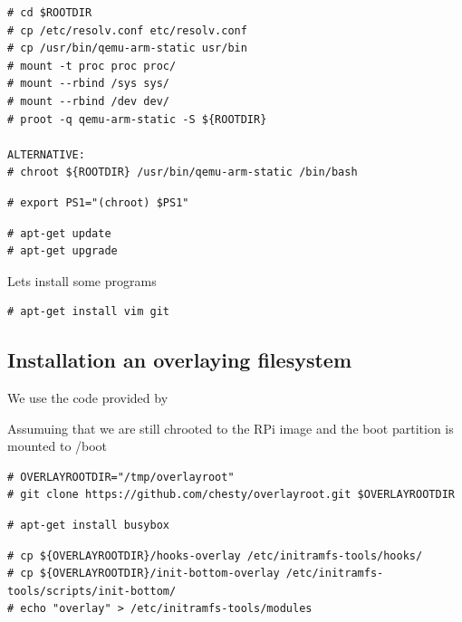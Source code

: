 \begin{lstlisting}[]
# cd $ROOTDIR
# cp /etc/resolv.conf etc/resolv.conf
# cp /usr/bin/qemu-arm-static usr/bin
# mount -t proc proc proc/
# mount --rbind /sys sys/
# mount --rbind /dev dev/
# proot -q qemu-arm-static -S ${ROOTDIR}

ALTERNATIVE:
# chroot ${ROOTDIR} /usr/bin/qemu-arm-static /bin/bash
\end{lstlisting}
\FloatBarrier


\begin{lstlisting}[]
# export PS1="(chroot) $PS1"
\end{lstlisting}
\FloatBarrier



\begin{lstlisting}[]
# apt-get update
# apt-get upgrade
\end{lstlisting}
\FloatBarrier

Lets install some programs
\begin{lstlisting}[]
# apt-get install vim git
\end{lstlisting}
\FloatBarrier



\subsection{Installation an overlaying filesystem}

We use the code provided by 

Assumuing that we are still chrooted to the RPi image and the boot partition is mounted to /boot

\begin{lstlisting}[]
# OVERLAYROOTDIR="/tmp/overlayroot"
# git clone https://github.com/chesty/overlayroot.git $OVERLAYROOTDIR
\end{lstlisting}
\FloatBarrier

\begin{lstlisting}[]
# apt-get install busybox
\end{lstlisting}
\FloatBarrier

\begin{lstlisting}[]
# cp ${OVERLAYROOTDIR}/hooks-overlay /etc/initramfs-tools/hooks/
# cp ${OVERLAYROOTDIR}/init-bottom-overlay /etc/initramfs-tools/scripts/init-bottom/
# echo "overlay" > /etc/initramfs-tools/modules
\end{lstlisting}
\FloatBarrier

